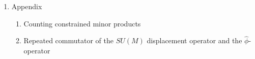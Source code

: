 \documentclass[12pt]{article}
\begin{document}
\begin{enumerate}
\begin{enumerate}
\begin{enumerate}
			\item Multireferential regimes
		
		\end{enumerate}
		
		\item Discussion
	
	\end{enumerate}
	
	
	\item Appendix
	
	\begin{enumerate}
	
		\item[A] Counting constrained minor products
		
		\item[B] Repeated commutator of the $SU(M)$ displacement operator and the $\hat{\phi}$-operator
	
	\end{enumerate}
	
	\end{enumerate}
	

	
\end{document}
